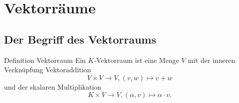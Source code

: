 \documentclass[main.tex]{subfiles}
\begin{document}
\section*{Vektorräume}
\subsection*{Der Begriff des Vektorraums}
\begin{karte}{Definition Vektorraum}
    Ein \( K \)-Vektorraum ist eine Menge \(V\) mit der inneren 
    Verknüpfung Vektoraddition 
    \[ V \times V \rightarrow V, (v,w) \mapsto v + w \]
    und der skalaren Multiplikation 
    \[ K \times V \rightarrow V, (\alpha, v) \mapsto 
    \alpha \cdot v. \]
\end{karte}
\end{document}
